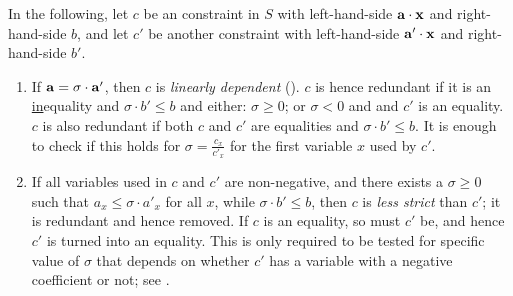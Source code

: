 In the following, let $c$ be an constraint in $S$ with left-hand-side $\mathbf{a}\cdot \mathbf{x}$ and right-hand-side $b$, and let $c'$ be another constraint with left-hand-side $\mathbf{a}'\cdot \mathbf{x}$ and right-hand-side $b'$. 
\begin{enumerate} \itemsep0em
\setcounter{enumi}{\value{counterName}}
\item 
If $\mathbf{a}=\sigma\cdot \mathbf{a}'$, then $c$ is \emph{linearly dependent} (\cite{lassez93}). $c$ is hence redundant if
it is an \underline{in}equality and $\sigma\cdot b'\leq b$ and either: $\sigma\geq 0$; or $\sigma<0$ and and $c'$ is an equality. $c$ is also redundant if both $c$ and $c'$ are equalities and $\sigma\cdot b'\leq b$. 
It is enough to check if this holds for $\sigma = \frac{c_x}{c'_x}$ for the first variable $x$ used by $c'$.
\item
If all variables used in $c$ and $c'$ are non-negative, and there exists a $\sigma\geq 0$ such that $a_x \leq \sigma \cdot a'_x$ for all $x$, while $\sigma\cdot b' \leq b$, then $c$ is \emph{less strict} than $c'$; it is redundant and hence removed. If $c$ is an equality, so must $c'$ be, and hence $c'$ is turned into an equality. 
This is only required to be tested for specific value of $\sigma$ that depends on whether $c'$ has a variable with a negative coefficient or not; see \cite{MyTechRep}.
\end{enumerate} 